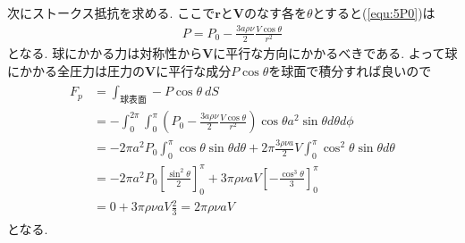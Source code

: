 \documentclass[uplatex,a4j,11pt,dvipdfmx]{jsarticle}
\begin{document}
次にストークス抵抗を求める.
ここで${\bm r}$と${\bm V}$のなす各を$\theta$とすると(\ref{equ:5P0})は
\begin{align}
  P=P_0-\frac{3a\rho\nu}{2}\frac{V\cos\theta}{r^2}
\end{align}
となる.
球にかかる力は対称性から${\bm V}$に平行な方向にかかるべきである.
よって球にかかる全圧力は圧力の${\bm V}$に平行な成分$P\cos\theta$を球面で積分すれば良いので
\begin{align*}
  \begin{split}
    F_p&=\int_{球表面}-P\cos\theta\ dS\\
    &=-\int_0^{2\pi}\int_0^\pi\left(P_0-\frac{3a\rho\nu}{2}\frac{V\cos\theta}{r^2}\right)\cos\theta a^2\sin\theta d\theta d\phi\\
    &=-2\pi a^2P_0\int_{0}^\pi\cos\theta\sin\theta d\theta+2\pi\frac{3\rho\nu a}{2}V\int_0^\pi\cos^2\theta\sin\theta d\theta\\
    &=-2\pi a^2P_0\left[\frac{\sin^2\theta}{2}\right]^\pi_0+3\pi\rho\nu aV\left[-\frac{\cos^3\theta}{3}\right]_0^\pi\\
    &=0+3\pi\rho\nu aV\frac{2}{3}=2\pi\rho\nu aV
  \end{split}
\end{align*}
となる.
\end{document}
